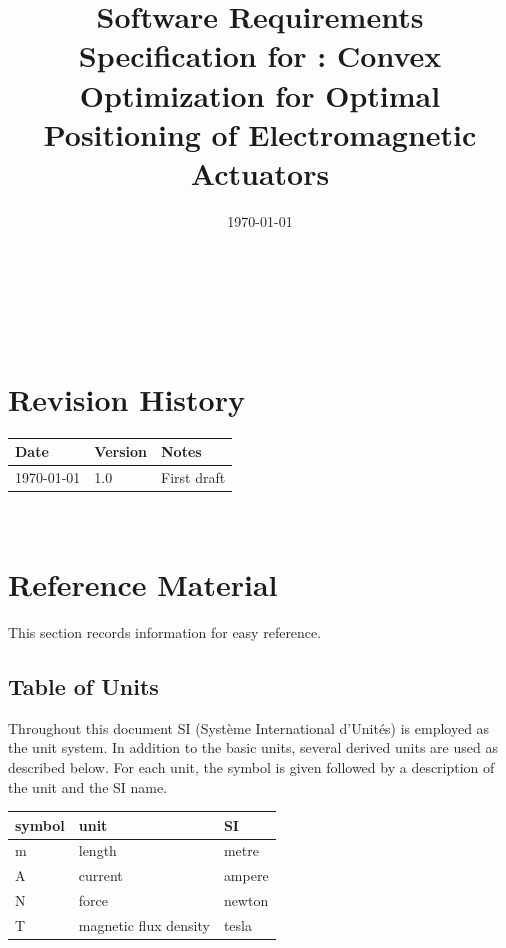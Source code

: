 \documentclass[12pt]{article}
\begin{document}
\title{Software Requirements Specification for \progname: Convex Optimization for Optimal Positioning of Electromagnetic Actuators} 
\author{\authname}
\date{\today}
	
\maketitle

~\newpage


\tableofcontents

~\newpage

\section*{Revision History}

\begin{tabularx}{\textwidth}{p{3cm}p{2cm}X}
\toprule {\bf Date} & {\bf Version} & {\bf Notes}\\
\midrule
\today & 1.0 & First draft\\
\bottomrule
\end{tabularx}


~\newpage

\section{Reference Material}

This section records information for easy reference.

\subsection{Table of Units}

Throughout this document SI (Syst\`{e}me International d'Unit\'{e}s) is employed
as the unit system.  In addition to the basic units, several derived units are
used as described below.  For each unit, the symbol is given followed by a
description of the unit and the SI name.
~\newline

\renewcommand{\arraystretch}{1.2}
  \noindent \begin{tabular}{l l l} 
    \toprule		
    \textbf{symbol} & \textbf{unit} & \textbf{SI}\\
    \midrule 
    \si{\metre} & length & metre\\
    \si{\ampere} & current & ampere\\
    \si{\newton} & force & newton\\
    \si{\tesla} & magnetic flux density & tesla\\
    \bottomrule
  \end{tabular}
\end{document}
